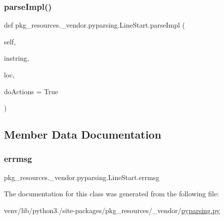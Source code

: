 \subsubsection{\texorpdfstring{parse\+Impl()}{parseImpl()}}
{\footnotesize\ttfamily def pkg\+\_\+resources.\+\_\+vendor.\+pyparsing.\+Line\+Start.\+parse\+Impl (\begin{DoxyParamCaption}\item[{}]{self,  }\item[{}]{instring,  }\item[{}]{loc,  }\item[{}]{do\+Actions = {\ttfamily True} }\end{DoxyParamCaption})}



\subsection{Member Data Documentation}
\mbox{\label{classpkg__resources_1_1__vendor_1_1pyparsing_1_1LineStart_acffeb01aa42138e4ddf5d24102836be5}} 
\subsubsection{\texorpdfstring{errmsg}{errmsg}}
{\footnotesize\ttfamily pkg\+\_\+resources.\+\_\+vendor.\+pyparsing.\+Line\+Start.\+errmsg}



The documentation for this class was generated from the following file\+:\begin{DoxyCompactItemize}
\item 
venv/lib/python3./site-\/packages/pkg\+\_\+resources/\+\_\+vendor/\hyperlink{pkg__resources_2__vendor_2pyparsing_8py}{pyparsing.\+py}\end{DoxyCompactItemize}
